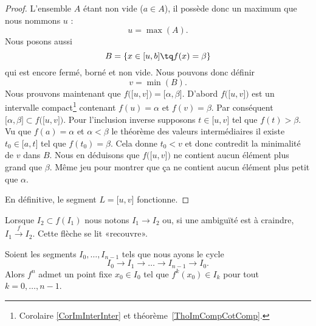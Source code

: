 \begin{proof}
	L'ensemble \( A\) étant non vide (\( a\in A\)), il possède donc un maximum que nous nommons \( u\) :
	\begin{equation}
		u=\max(A).
	\end{equation}
	Nous posons aussi
	\begin{equation}
		B=\{ x\in \mathopen[ u , b \mathclose]\tq f(x)=\beta \}
	\end{equation}
	qui est encore fermé, borné et non vide. Nous pouvons donc définir
	\begin{equation}
		v=\min(B).
	\end{equation}
	Nous prouvons maintenant que \( f\big( \mathopen[ u , v \mathclose] \big)=\mathopen[ \alpha , \beta \mathclose]\). D'abord \( f\big( \mathopen[ u , v \mathclose] \big)\) est un intervalle compact\footnote{Corolaire \ref{CorImInterInter} et théorème~\ref{ThoImCompCotComp}.} contenant \( f(u)=\alpha\) et \( f(v)=\beta\). Par conséquent \( \mathopen[ \alpha , \beta \mathclose]\subset f\big( \mathopen[ u , v \mathclose] \big)\). Pour l'inclusion inverse supposons \( t\in \mathopen[ u , v \mathclose]\) tel que \( f(t)>\beta\). Vu que \( f(a)=\alpha\) et \( \alpha<\beta\) le théorème des valeurs intermédiaires il existe \( t_0\in \mathopen[ a , t \mathclose]\) tel que \( f(t_0)=\beta\). Cela donne \( t_0<v\) et donc contredit la minimalité de \( v\) dans \( B\). Nous en déduisons que \( f\big( \mathopen[ u , v \mathclose] \big)\) ne contient aucun élément plus grand que \( \beta\). Même jeu pour montrer que ça ne contient aucun élément plus petit que \( \alpha\).

	En définitive, le segment \( L=\mathopen[ u , v \mathclose]\) fonctionne.
\end{proof}

Lorsque \( I_2\subset f(I_1)\) nous notons \( I_1\to I_2\) ou, si une ambiguïté est à craindre, \( I_1\stackrel{f}{\longrightarrow}I_2\). Cette flèche se lit «recouvre».
\begin{lemma}      \label{LemSSPXooMkwzjb}
	Soient les segments \( I_0,\ldots, I_{n-1}\) tels que nous ayons le cycle
	\begin{equation}
		I_0\to I_1\to\ldots\to I_{n-1}\to I_0.
	\end{equation}
	Alors \( f^n\) admet un point fixe \( x_0\in I_0\) tel que \( f^k(x_0)\in I_k\) pour tout \( k=0,\ldots, n-1\).
\end{lemma}

